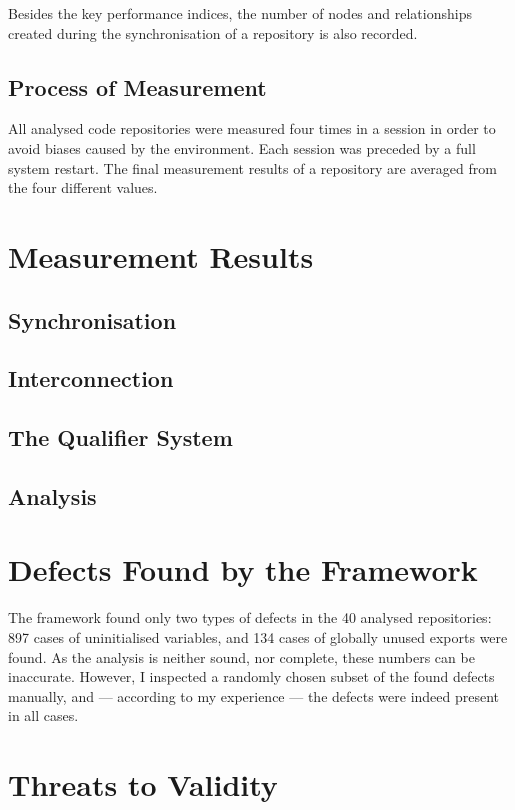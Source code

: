 Besides the key performance indices, the number of nodes and relationships created during the synchronisation of a repository is also recorded.


\subsection{Process of Measurement}

All analysed code repositories were measured four times in a session in order to avoid biases caused by the environment. Each session was preceded by a full system restart. The final measurement results of a repository are averaged from the four different values.


\section{Measurement Results}

\subsection{Synchronisation}

\subsection{Interconnection}

\subsection{The Qualifier System}

\subsection{Analysis}


\section{Defects Found by the Framework}

The framework found only two types of defects in the 40 analysed repositories: 897 cases of uninitialised variables, and 134 cases of globally unused exports were found. As the analysis is neither sound, nor complete, these numbers can be inaccurate. However, I inspected a randomly chosen subset of the found defects manually, and — according to my experience — the defects were indeed present in all cases.


\section{Threats to Validity}

